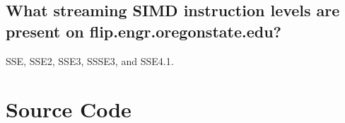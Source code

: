 \documentclass[letterpaper,10pt,titlepage]{article}
\begin{document}
\subsection{What streaming SIMD instruction levels are present on flip.engr.oregonstate.edu?}
SSE, SSE2, SSE3, SSSE3, and SSE4.1. 

\section{Source Code}

\end{document}
